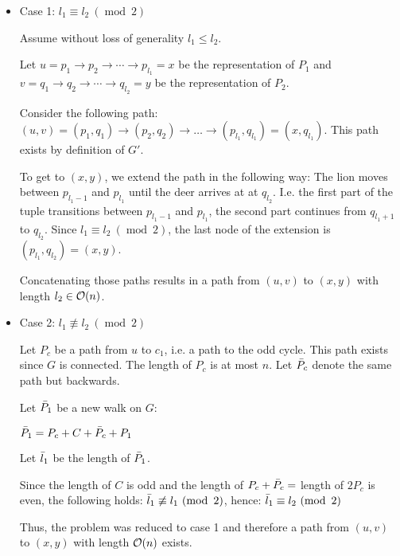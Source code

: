 \begin{itemize}
    \item Case 1: $l_1 \equiv l_2 ~ (\operatorname{mod}~ 2)$
    
    Assume without loss of generality $l_1 \leq l_2$.
    
    Let $u = p_1 \rightarrow p_2 \rightarrow \cdots \rightarrow p_{l_1} = x$ be the representation of $P_1$ and  $v = q_1 \rightarrow q_2 \rightarrow \cdots \rightarrow q_{l_2} = y$ be the representation of $P_2$.
    
    Consider the following path: $(u, v) = (p_1, q_1) \rightarrow (p_2, q_2) \rightarrow \dots \rightarrow (p_{l_1}, q_{l_1}) = (x, q_{l_1})$. This path exists by definition of $G'$. 
    
    To get to $(x, y)$, we extend the path in the following way: The lion moves between $p_{l_1 - 1}$ and  $p_{l_1}$ until the deer arrives at at $q_{l_2}$. I.e. the first part of the tuple transitions between $p_{l_1 - 1}$ and $p_{l_1}$, the second part continues from $q_{l_1 + 1}$ to $q_{l_2}$. Since $l_1 \equiv l_2 ~ (\operatorname{mod}~ 2)$, the last node of the extension is $(p_{l_1}, q_{l_2}) = (x, y)$. 
    
    Concatenating those paths results in a path from $(u,v)$ to $(x,y)$ with length $l_2 \in \mathcal{O}(n)$. 
    
    \item Case 2: $l_1 \not\equiv l_2 ~ (\operatorname{mod}~ 2)$
    
    Let $P_c$ be a path from $u$ to $c_1$, i.e. a path to the odd cycle. This path exists since $G$ is connected. The length of $P_c$ is at most $n$. Let $\Bar{P}_c$ denote the same path but backwards.
    
    Let $\Bar{P}_1$ be a new walk on $G$: 
    
    $\Bar{P}_1 = P_c + C + \Bar{P}_c + P_1$
    
    Let $\Bar{l}_1$ be the length of $\Bar{P}_1$.
    
    Since the length of $C$ is odd and the length of $P_c + \Bar{P}_c = $ length of $2P_c$ is even, the following holds: $\Bar{l}_1 \not\equiv l_1 ~ (\operatorname{mod}~ 2)$, hence: $ \Bar{l}_1 \equiv l_2 ~ (\operatorname{mod}~ 2)$ 
    
    Thus, the problem was reduced to case 1 and therefore a path from $(u,v)$ to $(x,y)$ with length $\mathcal{O}(n)$ exists.
    
\end{itemize}

